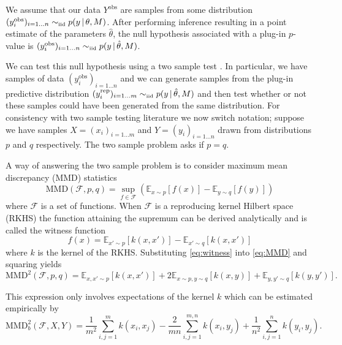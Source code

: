 \documentclass{article} %
\begin{document}
We assume that our data $Y^\textrm{obs}$ are \iid samples from some distribution ${(y^\textrm{obs}_i)_{i=1\ldots n} \simiid p(y\given \theta, M)}$.
After performing inference resulting in a point estimate of the parameters $\hat\theta$, the null hypothesis associated with a plug-in $p$-value is ${(y^\textrm{obs}_i)_{i=1\ldots n} \simiid p(y \given \hat\theta, M)}$.

We can test this null hypothesis using a two sample test \citep[e.g.][]{Hotelling1951-jd, Bickel1969-ao}.
In particular, we have samples of data $(y_i^\textrm{obs})_{i=1\ldots n}$ and we can generate samples from the plug-in predictive distribution ${(y_i^\textrm{rep})_{i=1\ldots m} \simiid p(y \given \hat\theta, M)}$ and then test whether or not these samples could have been generated from the same distribution.
For consistency with two sample testing literature we now switch notation; suppose we have samples ${X = (x_i)_{i=1\ldots m}}$ and ${Y = (y_i)_{i=1\ldots n}}$ drawn \iid from distributions $p$ and $q$ respectively.
The two sample problem asks if $p = q$.

A way of answering the two sample problem is to consider maximum mean discrepancy (MMD) \citep[e.g.][]{Gretton2008-gs} statistics
\vspace{-0.3\baselineskip}
\begin{equation}
\textrm{MMD}(\mathcal{F},p,q) = \sup_{f \in \mathcal{F}}(\mathbb{E}_{x\sim p}[f(x)] - \mathbb{E}_{y\sim q}[f(y)])
\label{eq:MMD}
\end{equation}
where $\mathcal{F}$ is a set of functions.
When $\mathcal{F}$ is a reproducing kernel Hilbert space (RKHS) the function attaining the supremum can be derived analytically and is called the witness function
\begin{equation}
f(x) = \mathbb{E}_{x'\sim p}[k(x,x')] - \mathbb{E}_{x'\sim q}[k(x,x')]
\label{eq:witness}
\end{equation}
where $k$ is the kernel of the RKHS.
Substituting \eqref{eq:witness} into \eqref{eq:MMD} and squaring yields
\vspace{-0.0\baselineskip}
\begin{equation}
  \textrm{MMD}^2(\mathcal{F},p,q) = \mathbb{E}_{x,x'\sim p}[k(x,x')] + 2\mathbb{E}_{x\sim p,y\sim q}[k(x,y)] + \mathbb{E}_{y,y'\sim q}[k(y,y')].
\end{equation}

\vspace{-0.3\baselineskip}

This expression only involves expectations of the kernel $k$ which can be estimated empirically by
\vspace{-0.1\baselineskip}
\begin{equation}
  \textrm{MMD}_b^2(\mathcal{F},X,Y) = \frac{1}{m^2}\sum_{i,j=1}^{m}k(x_i,x_j) - \frac{2}{mn}\sum_{i,j=1}^{m,n}k(x_i,y_j) + \frac{1}{n^2}\sum_{i,j=1}^{n}k(y_i,y_j).
\label{eq:MMD_b}
\end{equation}
\end{document}
